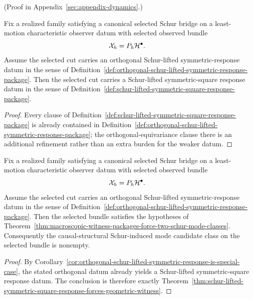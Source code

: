 (Proof in Appendix~\ref{sec:appendix-dynamics}.)

\begin{corollary}
\label{cor:orthogonal-schur-lifted-symmetric-response-is-special-case}
Fix a realized family satisfying a canonical selected Schur bridge on a
least-motion characteristic observer datum with selected observed bundle
\[
\mathcal X_h=P_h\mathcal{H}^\bullet.
\]
Assume the selected cut carries an orthogonal Schur-lifted
symmetric-response datum in the sense of
Definition~\ref{def:orthogonal-schur-lifted-symmetric-response-package}. Then
the selected cut carries a Schur-lifted symmetric-square response datum in
the sense of
Definition~\ref{def:schur-lifted-symmetric-square-response-package}.
\end{corollary}

\begin{proof}
Every clause of
Definition~\ref{def:schur-lifted-symmetric-square-response-package} is already
contained in
Definition~\ref{def:orthogonal-schur-lifted-symmetric-response-package}; the
orthogonal-equivariance clause there is an additional refinement rather than an
extra burden for the weaker datum.
\end{proof}

\begin{theorem}
\label{thm:orthogonal-schur-lifted-symmetric-response-forces-geometric-witness}
Fix a realized family satisfying a canonical selected Schur bridge on a
least-motion characteristic observer datum with selected observed bundle
\[
\mathcal X_h=P_h\mathcal{H}^\bullet.
\]
Assume the selected cut carries an orthogonal Schur-lifted
symmetric-response datum in the sense of
Definition~\ref{def:orthogonal-schur-lifted-symmetric-response-package}. Then
the selected bundle satisfies the hypotheses of
Theorem~\ref{thm:macroscopic-witness-packages-force-two-schur-mode-classes}.
Consequently the causal-structural Schur-induced mode candidate class on the
selected bundle is nonempty.
\end{theorem}

\begin{proof}
By
Corollary~\ref{cor:orthogonal-schur-lifted-symmetric-response-is-special-case},
the stated orthogonal datum already yields a Schur-lifted symmetric-square
response datum. The conclusion is therefore exactly
Theorem~\ref{thm:schur-lifted-symmetric-square-response-forces-geometric-witness}.
\end{proof}

